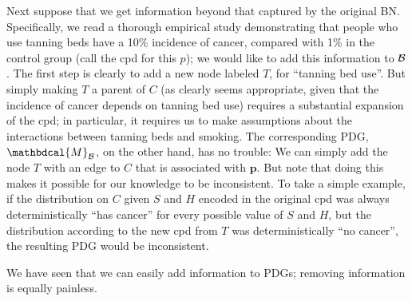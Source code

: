 \documentclass[letterpaper]{article} %
\theoremstyle{plain}
\theoremstyle{definition}
\theoremstyle{remark}
\newcommand\mat[1]{\mathbf{#1}}
\newcommand{\dg}[1]{\mathbdcal{#1}}
\newcommand{\PDGof}[1]{{\dg M}_{#1}}
\begin{document}
\begin{example}[emulating a BN]
Next suppose that we get information beyond that captured by the original BN.
Specifically, we read a thorough empirical study demonstrating that people who
use tanning beds have a 10\% incidence of cancer, compared with 1\% in the
control group 
(call the cpd for this $p$); we would like to add this information to
$\cal B$. The first step is clearly to add a new node labeled $T$, for ``tanning
bed use''.  But simply making $T$ a parent of $C$ (as clearly seems appropriate,
given that the incidence of cancer depends on tanning bed use) requires a
substantial expansion of the cpd; in particular, it requires us to make
assumptions about the interactions between tanning beds and smoking.  
The corresponding PDG, $\PDGof{{\mathcal B}}$, on the other hand, has no
trouble: We can simply add the node $T$ with an edge to $C$ that is associated
with $\mat p$.  But note that doing this makes it possible for our knowledge to
be inconsistent. To take a simple example, if the distribution on $C$ given $S$
and $H$ encoded in the original cpd was always deterministically ``has cancer''
for every possible value of $S$ and $H$, but the distribution according to the
new cpd from $T$ was deterministically ``no cancer'', the resulting PDG would be
inconsistent.  
\end{example}


We have seen that we can easily add information to PDGs; removing information is
equally painless.   
\end{document}
